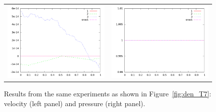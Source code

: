 \documentclass[10pt]{article}
\begin{document}
\begin{figure}
  \begin{center}
	\begin{tabular}{cc}
      \includegraphics[width=.475\textwidth]{vel_T7.png} &
	  \includegraphics[width=.475\textwidth]{prs_T7.png}
	\end{tabular}
  \end{center}
  \caption{Results from the same experiments as shown in Figure~\ref{fig:den_T7}:
  velocity (left panel) and pressure (right panel).}
\end{figure}

\clearpage
\end{document}
